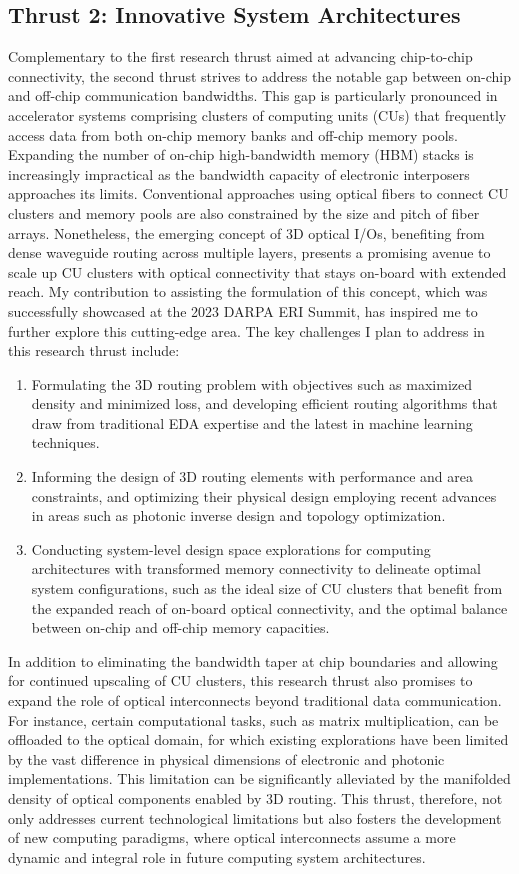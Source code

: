 \subsection{Thrust 2: Innovative System Architectures}
Complementary to the first research thrust aimed at advancing chip-to-chip connectivity, the second thrust strives to address the notable gap between on-chip and off-chip communication bandwidths. This gap is particularly pronounced in accelerator systems comprising clusters of computing units (CUs) that frequently access data from both on-chip memory banks and off-chip memory pools. Expanding the number of on-chip high-bandwidth memory (HBM) stacks is increasingly impractical as the bandwidth capacity of electronic interposers approaches its limits. Conventional approaches using optical fibers to connect CU clusters and memory pools are also constrained by the size and pitch of fiber arrays. Nonetheless, the emerging concept of 3D optical I/Os, benefiting from dense waveguide routing across multiple layers, presents a promising avenue to scale up CU clusters with optical connectivity that stays on-board with extended reach. My contribution to assisting the formulation of this concept, which was successfully showcased at the 2023 DARPA ERI Summit, has inspired me to further explore this cutting-edge area. The key challenges I plan to address in this research thrust include:
\begin{enumerate}[nosep]
    \item Formulating the 3D routing problem with objectives such as maximized density and minimized loss, and developing efficient routing algorithms that draw from traditional EDA expertise and the latest in machine learning techniques.
    \item Informing the design of 3D routing elements with performance and area constraints, and optimizing their physical design employing recent advances in areas such as photonic inverse design and topology optimization.
    \item Conducting system-level design space explorations for computing architectures with transformed memory connectivity to delineate optimal system configurations, such as the ideal size of CU clusters that benefit from the expanded reach of on-board optical connectivity, and the optimal balance between on-chip and off-chip memory capacities.
\end{enumerate}
In addition to eliminating the bandwidth taper at chip boundaries and allowing for continued upscaling of CU clusters, this research thrust also promises to expand the role of optical interconnects beyond traditional data communication. For instance, certain computational tasks, such as matrix multiplication, can be offloaded to the optical domain, for which existing explorations have been limited by the vast difference in physical dimensions of electronic and photonic implementations. This limitation can be significantly alleviated by the manifolded density of optical components enabled by 3D routing. This thrust, therefore, not only addresses current technological limitations but also fosters the development of new computing paradigms, where optical interconnects assume a more dynamic and integral role in future computing system architectures.
